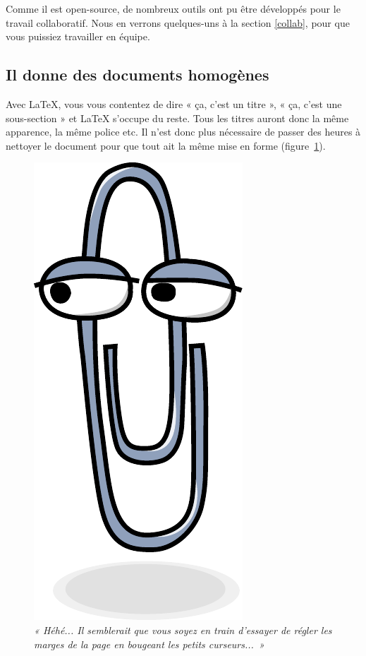 \documentclass[10pt]{article}
\begin{document}
Comme il est open-source, de nombreux outils ont pu être développés pour le travail collaboratif.
Nous en verrons quelques-uns à la section \ref{collab}, pour que vous puissiez travailler en équipe.

\subsection{Il donne des documents homogènes}

Avec LaTeX, vous vous contentez de dire « ça, c'est un titre », « ça, c'est une sous-section » et LaTeX s'occupe du reste.
Tous les titres auront donc la même apparence, la même police etc. Il n'est donc plus nécessaire de passer des heures à nettoyer le document pour que tout ait la même mise en forme (figure~\ref{clippy}).

\begin{figure}[h]
\centering\begin{minipage}{0.6\columnwidth}
	\caption{\emph{« Héhé... Il semblerait que vous soyez en train d'essayer de régler les marges de la page en bougeant les petits curseurs...~»}\label{clippy}}
\end{minipage}\hspace{5mm}\begin{minipage}{0.2\columnwidth}
	\includegraphics[width=0.7\linewidth]{figures/clippy}
\end{minipage}
\end{figure}
\end{document}
